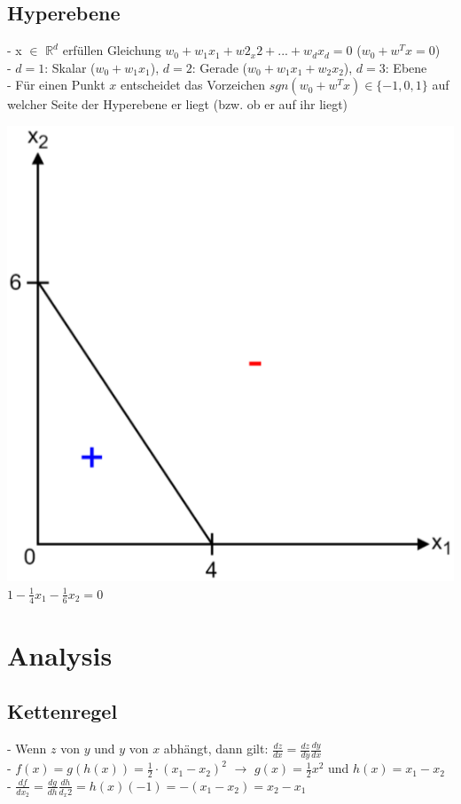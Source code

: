 \documentclass{report}
\begin{document}
\subsection{Hyperebene}
- x $\in$ $\mathbb{R}^d$ erfüllen Gleichung $w_0 + w_1x_1 + w2_x2 + ... + w_dx_d = 0$ ($w_0 + w^Tx = 0$)\\
- $d = 1$: Skalar ($w_0 + w_1x_1$), $d = 2$: Gerade ($w_0 + w_1x_1 + w_2x_2$), $d = 3$: Ebene\\
- Für einen Punkt $x$ entscheidet das Vorzeichen $sgn(w_0 + w^Tx)\in \{-1, 0, 1\}$ auf welcher Seite der Hyperebene er liegt (bzw. ob er auf ihr liegt)\\
\begin{center}
\includegraphics[scale=.2]{ml01_1} $1 - \frac{1}{4}x_1 - \frac{1}{6}x_2 = 0$
\end{center}

\section{Analysis}
\subsection{Kettenregel}
- Wenn $z$ von $y$ und $y$ von $x$ abhängt, dann gilt: $\frac{dz}{dx} = \frac{dz}{dy}\frac{dy}{dx}$\\
- $f(x) = g(h(x)) = \frac{1}{2}\cdot(x_1 - x_2)^2$ $\rightarrow$ $g(x) = \frac{1}{2}x^2$ und $h(x) = x_1 - x_2$\\
- $\frac{df}{dx_2} = \frac{dg}{dh}\frac{dh}{d_x2} = h(x)(-1) = -(x_1 - x_2) = x_2 - x_1$
\end{document}

